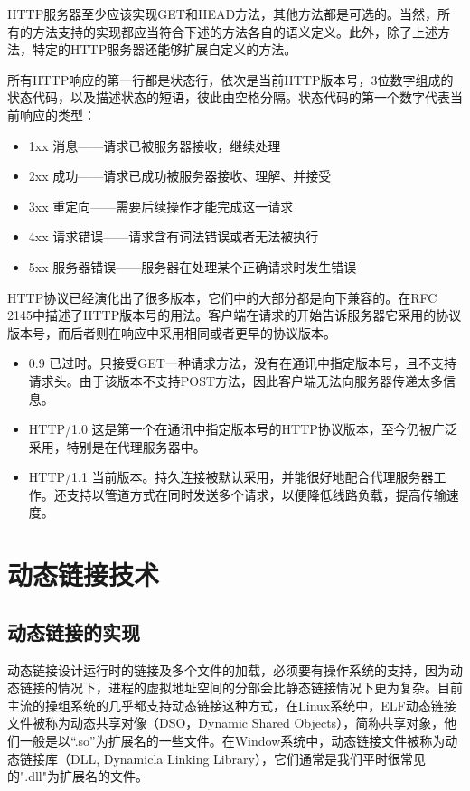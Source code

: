 \documentclass[12pt, twoside, a4paper, xetex]{report}
\begin{document}
	HTTP服务器至少应该实现GET和HEAD方法，其他方法都是可选的。当然，所有的方法支持的实现都应当符合下述的方法各自的语义定义。此外，除了上述方法，特定的HTTP服务器还能够扩展自定义的方法。
	
	所有HTTP响应的第一行都是状态行，依次是当前HTTP版本号，3位数字组成的状态代码，以及描述状态的短语，彼此由空格分隔。状态代码的第一个数字代表当前响应的类型：
	\begin{itemize}
		\item 1xx 消息——请求已被服务器接收，继续处理
		\item 2xx 成功——请求已成功被服务器接收、理解、并接受
		\item 3xx 重定向——需要后续操作才能完成这一请求
		\item 4xx 请求错误——请求含有词法错误或者无法被执行
		\item 5xx 服务器错误——服务器在处理某个正确请求时发生错误
	\end{itemize}
	
	HTTP协议已经演化出了很多版本，它们中的大部分都是向下兼容的。在RFC 2145中描述了HTTP版本号的用法。客户端在请求的开始告诉服务器它采用的协议版本号，而后者则在响应中采用相同或者更早的协议版本。
	\begin{itemize}
		\item 0.9 已过时。只接受GET一种请求方法，没有在通讯中指定版本号，且不支持请求头。由于该版本不支持POST方法，因此客户端无法向服务器传递太多信息。
		\item HTTP/1.0 这是第一个在通讯中指定版本号的HTTP协议版本，至今仍被广泛采用，特别是在代理服务器中。
		\item HTTP/1.1 当前版本。持久连接被默认采用，并能很好地配合代理服务器工作。还支持以管道方式在同时发送多个请求，以便降低线路负载，提高传输速度。
	\end{itemize}
\section{动态链接技术}
	\subsection{动态链接的实现}
	动态链接设计运行时的链接及多个文件的加载，必须要有操作系统的支持，因为动态链接的情况下，进程的虚拟地址空间的分部会比静态链接情况下更为复杂。目前主流的操组系统的几乎都支持动态链接这种方式，在Linux系统中，ELF动态链接文件被称为动态共享对像（DSO，Dynamic Shared Objects），简称共享对象，他们一般是以“.so”为扩展名的一些文件。在Window系统中，动态链接文件被称为动态链接库（DLL, Dynamicla Linking Library），它们通常是我们平时很常见的".dll"为扩展名的文件。
	
\end{document}
